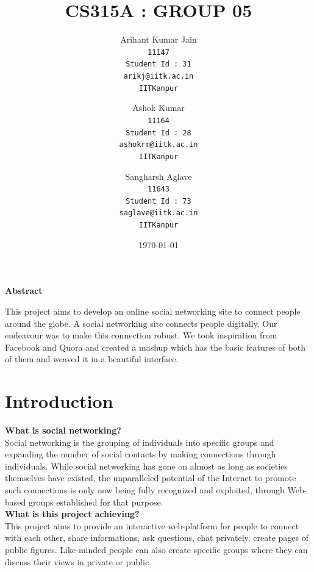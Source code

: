 \documentclass{article}
\newcommand{\subtitle}[1]{%
  \posttitle{%
    \par\end{center}
    \begin{center}\large#1\end{center}
    \vskip0.5em}%
}
\begin{document}
\title{CS315A : GROUP 05}
\subtitle{\textbf{ONLINE SOCIAL NETWORKING}}
\author{
  Arihant Kumar Jain\\
  \texttt{11147}\\  
  \texttt{Student Id : 31}\\
  \texttt{arikj@iitk.ac.in}\\
  \texttt{IITKanpur}
  \and
  Ashok Kumar\\
  \texttt{11164}\\
  \texttt{Student Id : 28}\\
  \texttt{ashokrm@iitk.ac.in}\\
  \texttt{IITKanpur}
  \and
  Sangharsh Aglave\\
  \texttt{11643}\\
  \texttt{Student Id : 73}\\
  \texttt{saglave@iitk.ac.in}\\
  \texttt{IITKanpur}
} 
\date{\today}
\newcommand{\sus}[2]{$#1_{#2}$}
\maketitle
\newpage
\newpage

\centerline{\textbf{Abstract}}
This project aims to develop an online social networking site to connect people around the globe. A social networking site connects people digitally. Our endeavour was to make this connection robust. We took inspiration from Facebook and Quora and created a mashup which has the basic features of both of them and weaved it in a beautiful interface.   

\section{Introduction}
\textbf{What is social networking?}\\
Social networking is the grouping of individuals into specific groups and expanding the number of social contacts by making connections through individuals. While social networking has gone on almost as long as societies themselves have existed, the unparalleled potential of the Internet to promote such connections is only now being fully recognized and exploited, through Web-based groups established for that purpose.\\

\textbf{What is this project achieving?}\\
This project aims to provide an interactive web-platform for people to connect with each other, share informations, ask questions, chat privately, create pages of public figures. Like-minded people can also create specific groups where they can discuss their views in private or public.
\end{document}
